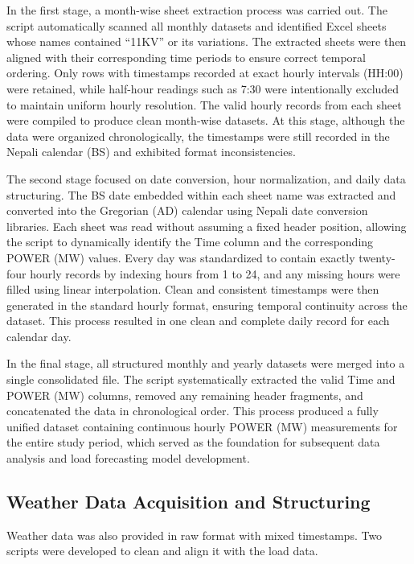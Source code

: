 \documentclass[oneside, 12pt]{book}
\numberwithin{equation}{chapter}
\newcommand{\sizexii}{\fontsize{12pt}{6pt}\selectfont}
\begin{document}
In the first stage, a month-wise sheet extraction process was carried out. The script automatically scanned all monthly datasets and identified Excel sheets whose names contained ``11KV'' or its variations. The extracted sheets were then aligned with their corresponding time periods to ensure correct temporal ordering. Only rows with timestamps recorded at exact hourly intervals (HH:00) were retained, while half-hour readings such as 7:30 were intentionally excluded to maintain uniform hourly resolution. The valid hourly records from each sheet were compiled to produce clean month-wise datasets. At this stage, although the data were organized chronologically, the timestamps were still recorded in the Nepali calendar (BS) and exhibited format inconsistencies.

The second stage focused on date conversion, hour normalization, and daily data structuring. The BS date embedded within each sheet name was extracted and converted into the Gregorian (AD) calendar using Nepali date conversion libraries. Each sheet was read without assuming a fixed header position, allowing the script to dynamically identify the Time column and the corresponding POWER (MW) values. Every day was standardized to contain exactly twenty-four hourly records by indexing hours from 1 to 24, and any missing hours were filled using linear interpolation. Clean and consistent timestamps were then generated in the standard hourly format, ensuring temporal continuity across the dataset. This process resulted in one clean and complete daily record for each calendar day.

In the final stage, all structured monthly and yearly datasets were merged into a single consolidated file. The script systematically extracted the valid Time and POWER (MW) columns, removed any remaining header fragments, and concatenated the data in chronological order. This process produced a fully unified dataset containing continuous hourly POWER (MW) measurements for the entire study period, which served as the foundation for subsequent data analysis and load forecasting model development.

\subsection{\sizexii Weather Data Acquisition and Structuring}

Weather data was also provided in raw format with mixed timestamps. Two scripts were developed to clean and align it with the load data.
\end{document}
